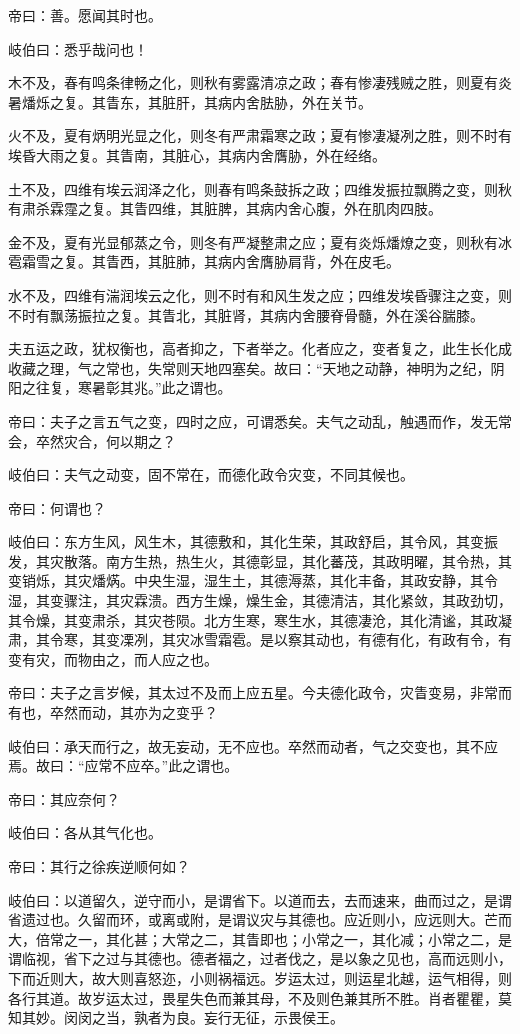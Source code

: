 \documentclass{article}%
\begin{document}
帝曰：善。愿闻其时也。

岐伯曰：悉乎哉问也！

木不及，春有鸣条律畅之化，则秋有雾露清凉之政；春有惨凄残贼之胜，则夏有炎暑燔烁之复。其眚东，其脏肝，其病内舍胠胁，外在关节。

火不及，夏有炳明光显之化，则冬有严肃霜寒之政；夏有惨凄凝冽之胜，则不时有埃昏大雨之复。其眚南，其脏心，其病内舍膺胁，外在经络。

土不及，四维有埃云润泽之化，则春有鸣条鼓拆之政；四维发振拉飘腾之变，则秋有肃杀霖霪之复。其眚四维，其脏脾，其病内舍心腹，外在肌肉四肢。

金不及，夏有光显郁蒸之令，则冬有严凝整肃之应；夏有炎烁燔燎之变，则秋有冰雹霜雪之复。其眚西，其脏肺，其病内舍膺胁肩背，外在皮毛。

水不及，四维有湍润埃云之化，则不时有和风生发之应；四维发埃昏骤注之变，则不时有飘荡振拉之复。其眚北，其脏肾，其病内舍腰脊骨髓，外在溪谷腨膝。

夫五运之政，犹权衡也，高者抑之，下者举之。化者应之，变者复之，此生长化成收藏之理，气之常也，失常则天地四塞矣。故曰：“天地之动静，神明为之纪，阴阳之往复，寒暑彰其兆。”此之谓也。

帝曰：夫子之言五气之变，四时之应，可谓悉矣。夫气之动乱，触遇而作，发无常会，卒然灾合，何以期之？

岐伯曰：夫气之动变，固不常在，而德化政令灾变，不同其候也。

帝曰：何谓也？

岐伯曰：东方生风，风生木，其德敷和，其化生荣，其政舒启，其令风，其变振发，其灾散落。南方生热，热生火，其德彰显，其化蕃茂，其政明曜，其令热，其变销烁，其灾燔焫。中央生湿，湿生土，其德溽蒸，其化丰备，其政安静，其令湿，其变骤注，其灾霖溃。西方生燥，燥生金，其德清洁，其化紧敛，其政劲切，其令燥，其变肃杀，其灾苍陨。北方生寒，寒生水，其德凄沧，其化清谧，其政凝肃，其令寒，其变凓冽，其灾冰雪霜雹。是以察其动也，有德有化，有政有令，有变有灾，而物由之，而人应之也。

帝曰：夫子之言岁候，其太过不及而上应五星。今夫德化政令，灾眚变易，非常而有也，卒然而动，其亦为之变乎？

岐伯曰：承天而行之，故无妄动，无不应也。卒然而动者，气之交变也，其不应焉。故曰：“应常不应卒。”此之谓也。

帝曰：其应奈何？

岐伯曰：各从其气化也。

帝曰：其行之徐疾逆顺何如？

岐伯曰：以道留久，逆守而小，是谓省下。以道而去，去而速来，曲而过之，是谓省遗过也。久留而环，或离或附，是谓议灾与其德也。应近则小，应远则大。芒而大，倍常之一，其化甚；大常之二，其眚即也；小常之一，其化减；小常之二，是谓临视，省下之过与其德也。德者福之，过者伐之，是以象之见也，高而远则小，下而近则大，故大则喜怒迩，小则祸福远。岁运太过，则运星北越，运气相得，则各行其道。故岁运太过，畏星失色而兼其母，不及则色兼其所不胜。肖者瞿瞿，莫知其妙。闵闵之当，孰者为良。妄行无征，示畏侯王。
\end{document}
